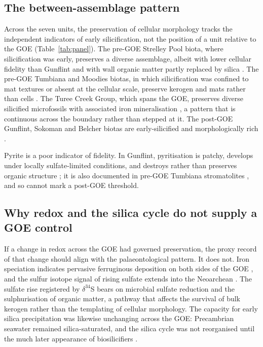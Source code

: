 \documentclass[11pt]{article}
\begin{document}
\subsection{The between-assemblage pattern}

Across the seven units, the preservation of cellular morphology tracks the independent indicators of
early silicification, not the position of a unit relative to the GOE (Table~\ref{tab:panel}). The
pre-GOE Strelley Pool biota, where silicification was early, preserves a diverse assemblage, albeit
with lower cellular fidelity than Gunflint and with wall organic matter partly replaced by silica
\citep{Wacey2012}. The pre-GOE Tumbiana and Moodies biotas, in which silicification was confined to
mat textures or absent at the cellular scale, preserve kerogen and mats rather than cells
\citep{Lepot2009,Homann2015}. The Turee Creek Group, which spans the GOE, preserves diverse
silicified microfossils with associated iron mineralisation \citep{Lepot2017TC,Barlow2018}, a pattern
that is continuous across the boundary rather than stepped at it. The post-GOE Gunflint, Sokoman and
Belcher biotas are early-silicified and morphologically rich \citep{Lepot2017,Javaux2018}.

Pyrite is a poor indicator of fidelity. In Gunflint, pyritisation is patchy, develops under locally
sulfate-limited conditions, and destroys rather than preserves organic structure
\citep{Wacey2013,Lepot2017}; it is also documented in pre-GOE Tumbiana stromatolites
\citep{Decraene2021}, and so cannot mark a post-GOE threshold.

\subsection{Why redox and the silica cycle do not supply a GOE control}

If a change in redox across the GOE had governed preservation, the proxy record of that change should
align with the palaeontological pattern. It does not. Iron speciation indicates pervasive ferruginous
deposition on both sides of the GOE \citep{Canfield1998,Poulton2011}, and the sulfur isotope signal
of rising sulfate extends into the Neoarchean \citep{Reinhard2009,Philippot2018}. The sulfate rise
registered by $\delta^{34}$S bears on microbial sulfate reduction and the sulphurisation of organic
matter, a pathway that affects the survival of bulk kerogen rather than the templating of cellular
morphology. The capacity for early silica precipitation was likewise unchanging across the GOE:
Precambrian seawater remained silica-saturated, and the silica cycle was not reorganised until the
much later appearance of biosilicifiers \citep{Siever1992,Perry2007}.
\end{document}
